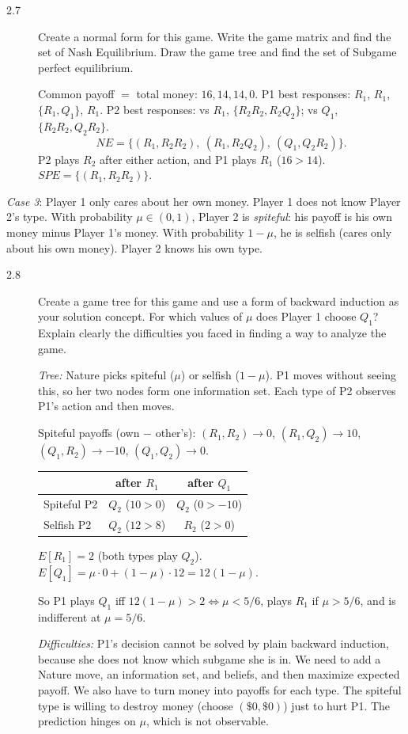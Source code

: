 \begin{description}
\item[2.7] Create a normal form for this game. Write the game matrix and find the set of Nash Equilibrium. Draw the game tree and find the set of Subgame perfect equilibrium.
\begin{solution}
Common payoff $=$ total money: $16,14,14,0$.
P1 best responses: $R_1$, $R_1$, $\{R_1,Q_1\}$, $R_1$. P2 best responses: vs $R_1$, $\{R_2R_2,R_2Q_2\}$; vs $Q_1$, $\{R_2R_2,Q_2R_2\}$.
\[NE=\{(R_1,R_2R_2),\ (R_1,R_2Q_2),\ (Q_1,Q_2R_2)\}.\]
P2 plays $R_2$ after either action, and P1 plays $R_1$ ($16>14$). $SPE=\{(R_1,R_2R_2)\}$.
\end{solution}
\end{description}

\emph{Case 3}: Player 1 only cares about her own money. Player 1 does not know Player 2's type. With probability $\mu\in(0,1)$, Player 2 is \emph{spiteful}: his payoff is his own money minus Player 1's money. With probability $1-\mu$, he is selfish (cares only about his own money). Player 2 knows his own type.

\begin{description}
\item[2.8] Create a game tree for this game and use a form of backward induction as your solution concept. For which values of $\mu$ does Player 1 choose $Q_1$? Explain clearly the difficulties you faced in finding a way to analyze the game.
\begin{solution}
\emph{Tree:} Nature picks spiteful ($\mu$) or selfish ($1-\mu$). P1 moves without seeing this, so her two nodes form one information set. Each type of P2 observes P1's action and then moves.

Spiteful payoffs (own $-$ other's): $(R_1,R_2)\to0$, $(R_1,Q_2)\to10$, $(Q_1,R_2)\to-10$, $(Q_1,Q_2)\to0$.
\begin{center}
\begin{tabular}{lcc}
 & after $R_1$ & after $Q_1$\\ \hline
Spiteful P2 & $Q_2$ ($10>0$) & $Q_2$ ($0>-10$)\\
Selfish P2 & $Q_2$ ($12>8$) & $R_2$ ($2>0$)
\end{tabular}
\end{center}
$E[R_1]=2$ (both types play $Q_2$). $E[Q_1]=\mu\cdot0+(1-\mu)\cdot12=12(1-\mu)$.

So P1 plays $Q_1$ iff $12(1-\mu)>2\iff\mu<5/6$, plays $R_1$ if $\mu>5/6$, and is indifferent at $\mu=5/6$.

\emph{Difficulties:} P1's decision cannot be solved by plain backward induction, because she does not know which subgame she is in. We need to add a Nature move, an information set, and beliefs, and then maximize expected payoff. We also have to turn money into payoffs for each type. The spiteful type is willing to destroy money (choose $(\$0,\$0)$) just to hurt P1. The prediction hinges on $\mu$, which is not observable.
\end{solution}
\end{description}

